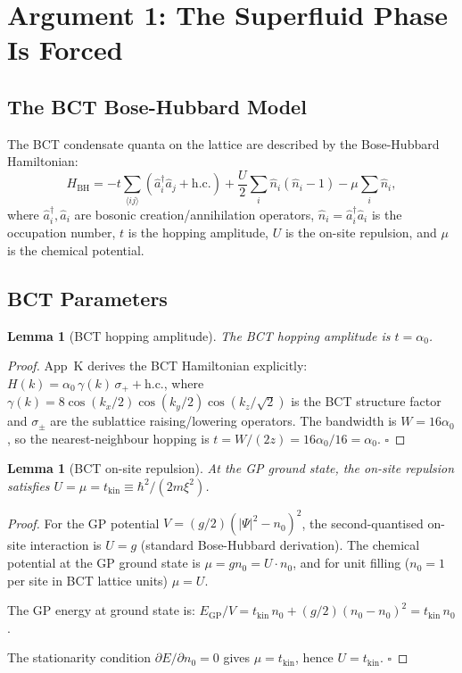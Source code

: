 \documentclass[11pt,a4paper]{article}
\theoremstyle{bctthm}
\newtheorem{lemma}[theorem]{Lemma}
\theoremstyle{definition}
\begin{document}
\section{Argument 1: The Superfluid Phase Is Forced}

\subsection{The BCT Bose-Hubbard Model}

The BCT condensate quanta on the lattice are described by the
Bose-Hubbard Hamiltonian:
\begin{equation}
H_\mathrm{BH} = -t\sum_{\langle ij\rangle}
\left(\hat{a}^\dagger_i \hat{a}_j + \mathrm{h.c.}\right)
+ \frac{U}{2}\sum_i \hat{n}_i(\hat{n}_i - 1)
- \mu\sum_i \hat{n}_i,
\label{eq:BH}
\end{equation}
where $\hat{a}_i^\dagger, \hat{a}_i$ are bosonic creation/annihilation operators,
$\hat{n}_i = \hat{a}^\dagger_i \hat{a}_i$ is the occupation number,
$t$ is the hopping amplitude, $U$ is the on-site repulsion,
and $\mu$ is the chemical potential.

\subsection{BCT Parameters}

\begin{lemma}[BCT hopping amplitude]\label{lem:t}
The BCT hopping amplitude is $t = \alpha_0$.
\end{lemma}
\begin{proof}
App~K derives the BCT Hamiltonian explicitly:
$H(k) = \alpha_0\,\gamma(k)\,\sigma_+ + \mathrm{h.c.}$,
where $\gamma(k) = 8\cos(k_x/2)\cos(k_y/2)\cos(k_z/\sqrt{2})$
is the BCT structure factor and $\sigma_\pm$ are the sublattice
raising/lowering operators. The bandwidth is $W = 16\alpha_0$,
so the nearest-neighbour hopping is $t = W/(2z) = 16\alpha_0/16 = \alpha_0$.
$\square$
\end{proof}

\begin{lemma}[BCT on-site repulsion]\label{lem:U}
At the GP ground state, the on-site repulsion satisfies
$U = \mu = t_\mathrm{kin} \equiv \hbar^2/(2m\xi^2)$.
\end{lemma}
\begin{proof}
For the GP potential $V = (g/2)(|\Psi|^2-n_0)^2$, the second-quantised
on-site interaction is $U = g$ (standard Bose-Hubbard derivation).
The chemical potential at the GP ground state is
$\mu = gn_0 = U \cdot n_0$, and for unit filling ($n_0 = 1$ per site
in BCT lattice units) $\mu = U$.

The GP energy at ground state is:
$E_\mathrm{GP}/V = t_\mathrm{kin}\,n_0 + (g/2)(n_0-n_0)^2 = t_\mathrm{kin}\,n_0$.

The stationarity condition $\partial E/\partial n_0 = 0$
gives $\mu = t_\mathrm{kin}$, hence $U = t_\mathrm{kin}$. $\square$
\end{proof}
\end{document}

